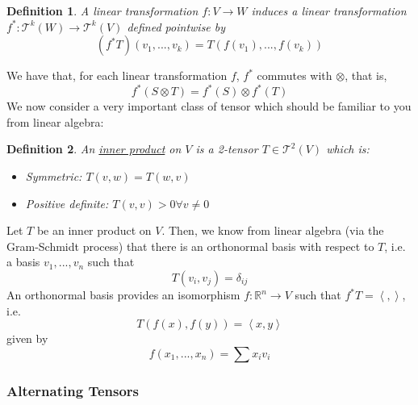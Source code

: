 \documentclass{article}
\newtheorem{definition}{Definition}
\newcommand{\reals}[0]{\mathbb{R}}
\newcommand{\mc}[1]{\mathcal{#1}}
\newcommand{\ip}[2]{\left\langle#1,#2\right\rangle}
\begin{document}
\begin{definition}
A linear transformation \(f: V \to W\) induces a linear transformation \(f^*: \mc{T}^k(W) \to \mc{T}^k(V)\) defined pointwise by
\begin{equation}
  (f^*T)(v_1,...,v_k) = T(f(v_1),...,f(v_k))
\end{equation}
\end{definition}
We have that, for each linear transformation \(f\), \(f^*\) commutes with \(\otimes\), that is,
\begin{equation}
  f^*(S \otimes T) = f^*(S) \otimes f^*(T)
\end{equation}
We now consider a very important class of tensor which should be familiar to you from linear algebra:
\begin{definition}
  An \underline{inner product} on \(V\) is a 2-tensor \(T \in \mc{T}^2(V)\) which is:
  \begin{itemize}

    \item Symmetric: \(T(v, w) = T(w, v)\)

    \item Positive definite: \(T(v, v) > 0 \forall v \neq 0\)

  \end{itemize}
\end{definition}
Let \(T\) be an inner product on \(V\). Then, we know from linear algebra (via the Gram-Schmidt process) that there is an orthonormal basis with respect to \(T\), i.e. a basis \(v_1,...,v_n\) such that
\begin{equation}
  T(v_i, v_j) = \delta_{ij}
\end{equation}
An orthonormal basis provides an isomorphism \(f: \reals^n \to V\) such that \(f^*T = \ip{}{}\), i.e.
\begin{equation}
  T(f(x), f(y)) = \ip{x}{y}
\end{equation}
given by
\begin{equation}
  f(x_1,...,x_n) = \sum x_iv_i
\end{equation}

\subsubsection{Alternating Tensors}
\end{document}
